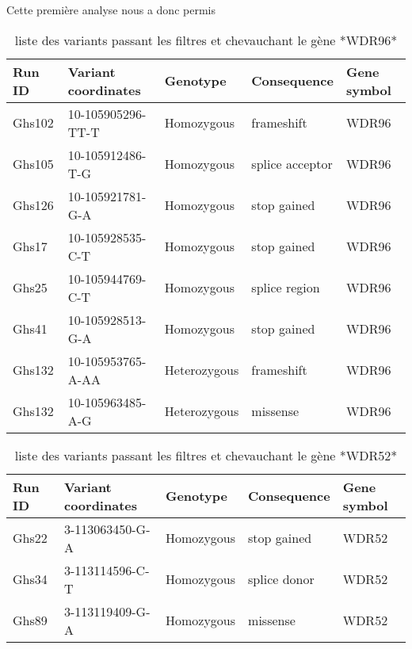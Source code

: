 \documentclass[12pt,twoside]{reedthesis}
\theoremstyle{definition}
\theoremstyle{definition}
\theoremstyle{remark}
\begin{document}
  Cette première analyse nous a donc permis
  
  \newpage
  
  \begin{longtable}[t]{lllll}
  \caption{\label{tab:tabwdr96}liste des variants passant les filtres et chevauchant le gène *WDR96*}\\
  \toprule
  Run ID & Variant coordinates & Genotype & Consequence & Gene symbol\\
  \midrule
  Ghs102 & 10-105905296-TT-T & Homozygous & frameshift & WDR96\\
  Ghs105 & 10-105912486-T-G & Homozygous & splice acceptor & WDR96\\
  Ghs126 & 10-105921781-G-A & Homozygous & stop gained & WDR96\\
  Ghs17 & 10-105928535-C-T & Homozygous & stop gained & WDR96\\
  Ghs25 & 10-105944769-C-T & Homozygous & splice region & WDR96\\
  \addlinespace
  Ghs41 & 10-105928513-G-A & Homozygous & stop gained & WDR96\\
  Ghs132 & 10-105953765-A-AA & Heterozygous & frameshift & WDR96\\
  Ghs132 & 10-105963485-A-G & Heterozygous & missense & WDR96\\
  \bottomrule
  \end{longtable}
  
  \begin{longtable}[t]{lllll}
  \caption{\label{tab:tabwdr52}liste des variants passant les filtres et chevauchant le gène *WDR52*}\\
  \toprule
  Run ID & Variant coordinates & Genotype & Consequence & Gene symbol\\
  \midrule
  Ghs22 & 3-113063450-G-A & Homozygous & stop gained & WDR52\\
  Ghs34 & 3-113114596-C-T & Homozygous & splice donor & WDR52\\
  Ghs89 & 3-113119409-G-A & Homozygous & missense & WDR52\\
  \bottomrule
  \end{longtable}
  
\end{document}
